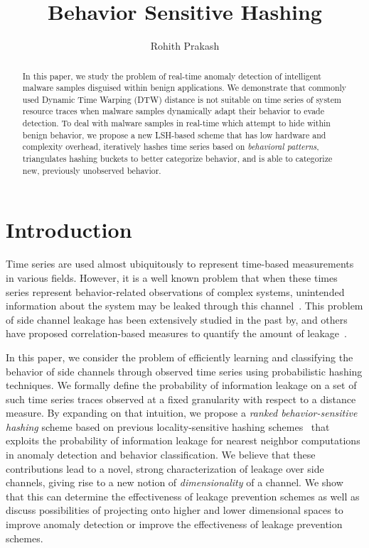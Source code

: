 \documentclass[a4paper]{article}
\title{Behavior Sensitive Hashing}
\author{Rohith Prakash}
\date{}
\theoremstyle{def}
\theoremstyle{thm}
\begin{document}
\maketitle{}

\begin{abstract}
    In this paper, we study the problem of real-time anomaly detection of intelligent malware samples disguised within benign applications. 
    We demonstrate that commonly used Dynamic Time Warping (DTW) distance is not suitable on time series of system resource traces when malware samples dynamically adapt their behavior to evade detection.
    To deal with malware samples in real-time which attempt to hide within benign behavior, we propose a new LSH-based scheme that has low hardware and complexity overhead, iteratively hashes time series based on \textit{behavioral patterns}, triangulates hashing buckets to better categorize behavior, and is able to categorize new, previously unobserved behavior.
\end{abstract}

\section{Introduction}
\label{sec:intro}

Time series are used almost ubiquitously to represent time-based measurements in various fields.
However, it is a well known problem that when these times series represent behavior-related observations of complex systems, unintended information about the system may be leaked through this channel~\cite{DBLP:conf/ccs/RistenpartTSS09,DBLP:conf/sp/ZhangJOR11}.
This problem of side channel leakage has been extensively studied in the past by, and others have proposed correlation-based measures to quantify the amount of leakage~\cite{demme2012,zhang2013}.

In this paper, we consider the problem of efficiently learning and classifying the behavior of side channels through observed time series using probabilistic hashing techniques.
We formally define the probability of information leakage on a set of such time series traces observed at a fixed granularity with respect to a distance measure.
By expanding on that intuition, we propose a \textit{ranked behavior-sensitive hashing} scheme based on previous locality-sensitive hashing schemes~\cite{Kulis12-KLSH,Jiang15-KLSH,Kim16-SLSH} that exploits the probability of information leakage for nearest neighbor computations in anomaly detection and behavior classification.
We believe that these contributions lead to a novel, strong characterization of leakage over side channels, giving rise to a new notion of \textit{dimensionality} of a channel.
We show that this can determine the effectiveness of leakage prevention schemes as well as discuss possibilities of projecting onto higher and lower dimensional spaces to improve anomaly detection or improve the effectiveness of leakage prevention schemes.
\end{document}
